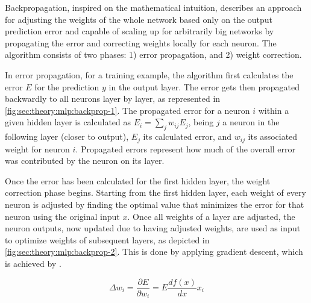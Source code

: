 Backpropagation, inspired on the mathematical intuition, describes an approach for adjusting the weights of the whole network based only on the output prediction error and capable of scaling up for arbitrarily big networks by propagating the error and correcting weights locally for each neuron.
The algorithm consists of two phases: 1) error propagation, and 2) weight correction.

In error propagation, for a training example, the algorithm first calculates the error $E$ for the prediction $y$ in the output layer.
The error gets then propagated backwardly to all neurons layer by layer, as represented in \autoref{fig:sec:theory:mlp:backprop-1}.
The propagated error for a neuron $i$ within a given hidden layer is calculated as $E_{i} = \sum_j w_{ij} E_{j}$, being $j$ a neuron in the following layer (closer to output), $E_{j}$ its calculated error, and $w_{ij}$ its associated weight for neuron $i$.
Propagated errors represent how much of the overall error was contributed by the neuron on its layer.

Once the error has been calculated for the first hidden layer, the weight correction phase begins.
Starting from the first hidden layer, each weight of every neuron is adjusted by finding the optimal value that minimizes the error for that neuron using the original input $x$.
Once all weights of a layer are adjusted, the neuron outputs, now updated due to having adjusted weights, are used as input to optimize weights of subsequent layers, as depicted in \autoref{fig:sec:theory:mlp:backprop-2}.
This is done by applying gradient descent, which is achieved by .

$$\Delta w_i = \frac{\partial E}{\partial w_i} = E \frac{df(x)}{dx}x_i$$

